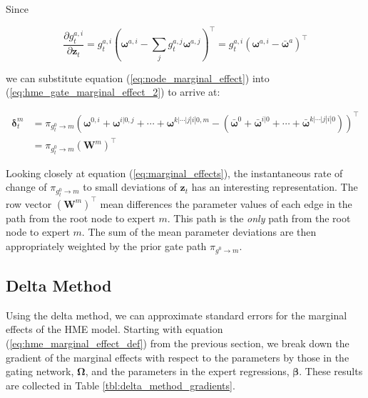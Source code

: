 \documentclass[12pt]{article}
\newcommand{\bw}[1]{\boldsymbol{\omega}^{#1}}
\newcommand{\mean}[1]{\bar{#1}}
\newcommand{\gateprod}[2]{\pi_{#1 \longrightarrow #2}}
\theoremstyle{definition}
\begin{document}
Since

\begin{equation} \label{eq:node_marginal_effect}
  \frac{\partial g^{a, i}_{t}}{\partial \boldsymbol{z}_{t}} = g^{a, i}_{t} \left( \bw{a, i} - \sum_{j} g^{a, j}_{t} \bw{a, j} \right)^{\top} = g^{a, i}_{t} \left( \bw{a, i} - \mean{\boldsymbol{\omega}}^{a} \right)^{\top}
\end{equation}

we can substitute equation (\ref{eq:node_marginal_effect}) into
(\ref{eq:hme_gate_marginal_effect_2}) to arrive at:

\begin{equation} \label{eq:marginal_effects}
  \begin{split}
    \boldsymbol{\delta}^{m}_{t} &= \gateprod{g^{0}_{t}}{m} \left(\boldsymbol{\omega}^{0, i} + \boldsymbol{\omega}^{i|0, j} + \cdots + \boldsymbol{\omega}^{k|\cdots|j|i|0, m} - \left( \mean{\boldsymbol{\omega}}^{0} + \mean{\boldsymbol{\omega}}^{i|0} + \cdots + \mean{\boldsymbol{\omega}}^{k|\cdots|j|i|0} \right) \right)^{\top} \\
                                &= \gateprod{g^{0}_{t}}{m} ( \boldsymbol{W}^{m} )^{\top}
  \end{split}
\end{equation}

Looking closely at equation (\ref{eq:marginal_effects}), the instantaneous rate
of change of $\gateprod{g^{0}_{t}}{m}$ to small deviations of $\boldsymbol{z}_{t}$
has an interesting representation. The row vector $( \boldsymbol{W}^{m} )^{\top}$
mean differences the parameter values of each edge in the path from the
root node to expert $m$. This path is the \textit{only} path from the root
node to expert $m$. The sum of the mean parameter deviations are then appropriately
weighted by the prior gate path $\gateprod{g^{0}}{m}$.


\subsection{Delta Method}

Using the delta method, we can approximate standard
errors for the marginal effects of the HME model. Starting with equation
(\ref{eq:hme_marginal_effect_def}) from the previous section, we break down
the gradient of the marginal effects with respect to the parameters by those 
in the gating network, $\boldsymbol{\Omega}$, and the parameters in the
expert regressions, $\boldsymbol{\beta}$. These results are collected in Table
 \ref{tbl:delta_method_gradients}.
\end{document}
